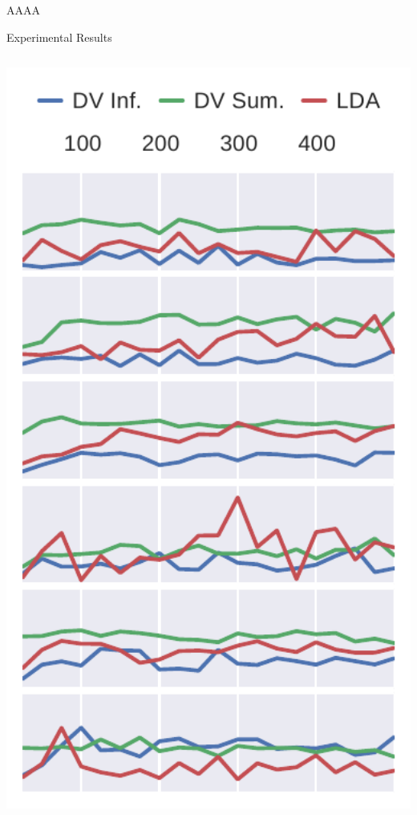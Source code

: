 \documentclass[final]{beamer} %
\begin{document}
\begin{frame}
\begin{beamercolorbox}[center]{AAAA}
\begin{minipage}[T]{.97\textwidth}
\begin{block}{Experimental Results}
\begin{columns}
\begin{column}{0.24\textwidth}
          \includegraphics[width=1\textwidth]{../figures/mrr_graph}
        \end{column}
        \end{columns}
        \hfill \hfill

      \end{block}
    \end{minipage}
  \end{beamercolorbox}

  \vskip 1cm

  \end{frame}
\end{document}
